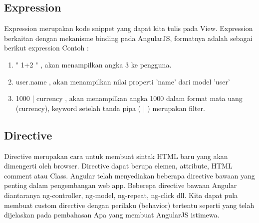 \subsection{Expression}
\label{sub: expression}

	Expression merupakan kode snippet yang dapat kita tulis pada View. Expression berkaitan dengan mekanisme binding pada AngularJS, formatnya adalah sebagai berikut {{ expression }} Contoh :
	
	\begin{enumerate}
		\item "{{ 1+2 }}" , akan menampilkan angka 3 ke pengguna.
		\item {{ user.name }} , akan menampilkan nilai properti 'name' dari model 'user'
		\item {{ 1000 | currency }} , akan menampilkan angka 1000 dalam format mata uang (currency), keyword setelah tanda pipa ( | ) merupakan filter.
	\end{enumerate}

\subsection{Directive}
\label{sub: directive}

	Directive merupakan cara untuk membuat sintak HTML baru yang akan dimengerti oleh browser. Directive dapat berupa elemen, attribute, HTML comment atau Class. Angular telah menyediakan beberapa directive bawaan yang penting dalam pengembangan web app. Beberepa directive bawaan Angular diantaranya ng-controller, ng-model, ng-repeat, ng-click dll. Kita dapat pula membuat custom directive dengan perilaku (behavior) tertentu seperti yang telah dijelaskan pada pembahasan Apa yang membuat AngularJS istimewa.
	

	
 